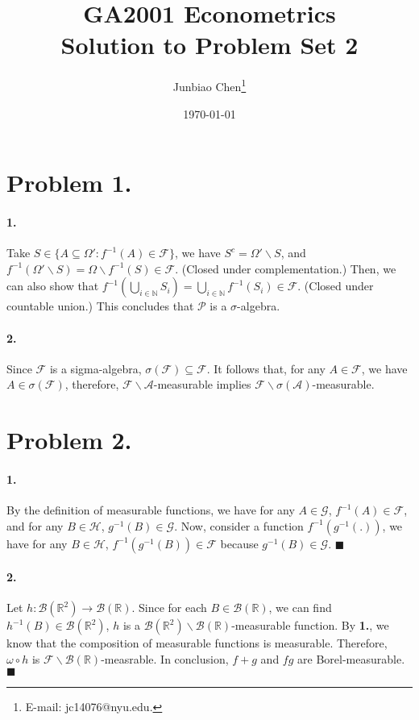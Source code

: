 \documentclass[11pt]{article}
\title{GA2001 Econometrics \\Solution to Problem Set 2}
\author{
Junbiao Chen\thanks{E-mail: jc14076@nyu.edu.}
}
\date{\today}
\theoremstyle{definition}
\theoremstyle{boldtitle} %
\numberwithin{equation}{section}
\numberwithin{figure}{section}
\numberwithin{table}{section}
\begin{document}
\maketitle
\section*{Problem 1.}
\paragraph{1.} Take $S \in \{A \subseteq \Omega': f^{-1}(A) \in \mathcal{F}\}$,
we have $S^c = \Omega' \backslash S$, and $f^{-1} (\Omega'\backslash S) = \Omega \backslash f^{-1} (S) \in \mathcal{F}$. (Closed under complementation.)
Then, we can also show that 
$f^{-1}(\bigcup_{i \in \mathbb{N}} S_i) =  \bigcup_{i \in \mathbb{N}} f^{-1}(S_i) \in \mathcal{F}$. (Closed under countable union.)
This concludes that $\mathcal{P}$ is a $\sigma$-algebra.

\paragraph{2.} Since $\mathcal{F}$ is a sigma-algebra, 
$\sigma(\mathcal{F}) \subseteq \mathcal{F}$.
It follows that, for any $A \in \mathcal{F}$, we have $A \in \sigma(\mathcal{F})$,
therefore, $\mathcal{F}\backslash \mathcal{A}$-measurable implies $\mathcal{F}\backslash \mathcal{\sigma(A)}$-measurable.





\section*{Problem 2.} 
\paragraph{1.} By the definition of measurable functions, we have 
for any $A \in \mathcal{G}$, $f^{-1}(A) \in \mathcal{F}$, 
and for any $B \in \mathcal{H}$, $g^{-1}(B) \in \mathcal{G}$.
Now, consider a function $f^{-1}(g^{-1}(.))$, we have 
for any $B \in \mathcal{H}$, $f^{-1}(g^{-1}(B)) \in \mathcal{F}$ because $g^{-1}(B) \in \mathcal{G}$.
\(\blacksquare\)

\paragraph{2.}
Let $h: \mathcal{B}(\mathbb{R}^2) \rightarrow \mathcal{B}(\mathbb{R})$.
Since for each $B \in \mathcal{B}(\mathbb{R})$, we can find $h^{-1}(B) \in \mathcal{B}(\mathbb{R}^2)$,
$h$ is a $\mathcal{B}(\mathbb{R}^2)\backslash \mathcal{B}(\mathbb{R})$-measurable function.
By \textbf{1.}, we know that the composition of measurable functions is measurable.
Therefore, $\omega \circ h$ is $\mathcal{F}\backslash \mathcal{B}(\mathbb{R})$-measrable.
In conclusion, $f+g$ and $fg$ are Borel-measurable. \(\blacksquare\)
\end{document}
